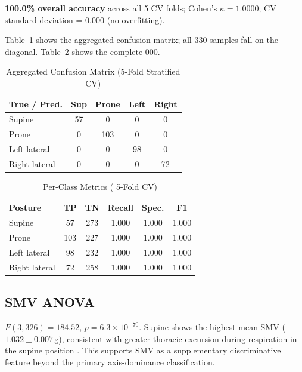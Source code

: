 \documentclass[journal]{IEEEtran}
\begin{document}
\textbf{100.0\% overall accuracy} across all 5 CV folds; Cohen's
$\kappa = 1.0000$; CV standard deviation = 0.000 (no overfitting).

Table~\ref{tab:confusion} shows the aggregated confusion matrix; all 330 samples
fall on the diagonal. Table~\ref{tab:metrics} shows the complete 000.

\begin{table}[h]
\centering
\caption{Aggregated Confusion Matrix (5-Fold Stratified CV)}
\label{tab:confusion}
\begin{tabular}{lcccc}
\toprule
\textbf{True / Pred.} & Sup & Prone & Left & Right \\
\midrule
Supine        &  57 & 0   & 0  & 0  \\
Prone         &   0 & 103 & 0  & 0  \\
Left lateral  &   0 & 0   & 98 & 0  \\
Right lateral &   0 & 0   & 0  & 72 \\
\bottomrule
\end{tabular}
\end{table}

\begin{table}[h]
\centering
\caption{Per-Class Metrics ( 5-Fold CV)}
\label{tab:metrics}
\begin{tabular}{lccccc}
\toprule
\textbf{Posture} & \textbf{TP} & \textbf{TN} & \textbf{Recall} & \textbf{Spec.} & \textbf{F1} \\
\midrule
Supine        &  57 & 273 & 1.000 & 1.000 & 1.000 \\
Prone         & 103 & 227 & 1.000 & 1.000 & 1.000 \\
Left lateral  &  98 & 232 & 1.000 & 1.000 & 1.000 \\
Right lateral &  72 & 258 & 1.000 & 1.000 & 1.000 \\
\bottomrule
\end{tabular}
\end{table}

\subsection{SMV ANOVA}

$F(3,326)=184.52$, $p=6.3\times10^{-70}$. Supine shows the highest mean SMV
($1.032\pm0.007$\,g), consistent with greater thoracic excursion during respiration
in the supine position \cite{razjouyan2017}. This supports SMV as a supplementary
discriminative feature beyond the primary axis-dominance classification.
\end{document}
